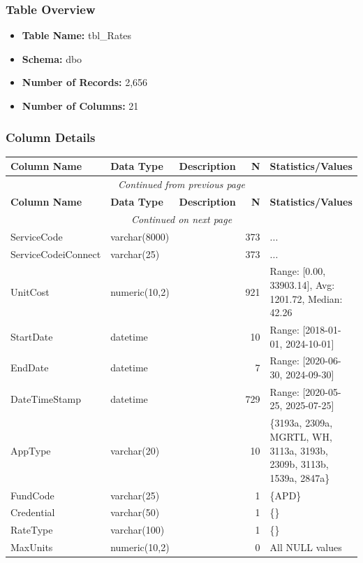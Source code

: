 \begin{landscape}
\subsubsection{Table Overview}
\begin{itemize}
\item \textbf{Table Name:} tbl\_Rates
\item \textbf{Schema:} dbo
\item \textbf{Number of Records:} 2,656
\item \textbf{Number of Columns:} 21
\end{itemize}

\subsubsection{Column Details}
\begin{longtable}{|l|l|l|r|p{6cm}|}
\hline
\textbf{Column Name} & \textbf{Data Type} & \textbf{Description} & \textbf{N} & \textbf{Statistics/Values} \\
\hline
\endfirsthead
\multicolumn{5}{c}{\textit{Continued from previous page}} \\
\hline
\textbf{Column Name} & \textbf{Data Type} & \textbf{Description} & \textbf{N} & \textbf{Statistics/Values} \\
\hline
\endhead
\hline
\multicolumn{5}{c}{\textit{Continued on next page}} \\
\endfoot
\hline
\endlastfoot
ServiceCode & varchar(8000) &  & 373 & ... \\
\hline
ServiceCodeiConnect & varchar(25) &  & 373 & ... \\
\hline
UnitCost & numeric(10,2) &  & 921 & Range: [0.00, 33903.14], Avg: 1201.72, Median: 42.26 \\
\hline
StartDate & datetime &  & 10 & Range: [2018-01-01, 2024-10-01] \\
\hline
EndDate & datetime &  & 7 & Range: [2020-06-30, 2024-09-30] \\
\hline
DateTimeStamp & datetime &  & 729 & Range: [2020-05-25, 2025-07-25] \\
\hline
AppType & varchar(20) &  & 10 & \{3193a, 2309a, MGRTL, WH, 3113a, 3193b, 2309b, 3113b, 1539a, 2847a\} \\
\hline
FundCode & varchar(25) &  & 1 & \{APD\} \\
\hline
Credential & varchar(50) &  & 1 & \{\} \\
\hline
RateType & varchar(100) &  & 1 & \{\} \\
\hline
MaxUnits & numeric(10,2) &  & 0 & All NULL values \\

\end{longtable}
\end{landscape}

